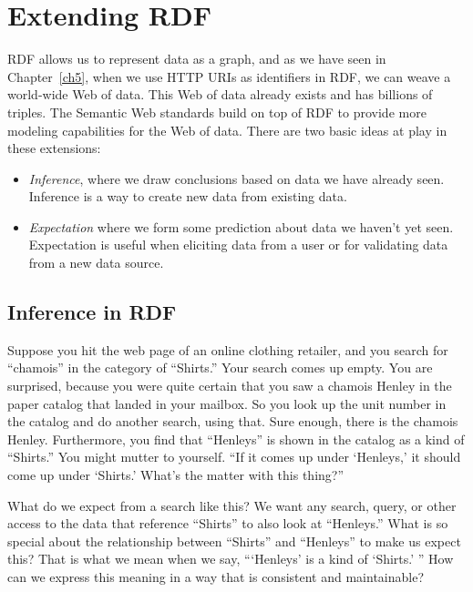 \chapter{Extending RDF}
\label{ch7}

RDF allows us to represent data as a graph, and as we have seen in Chapter~\ref{ch5}, when we use HTTP URIs as 
identifiers in RDF, we can weave a world-wide Web of data.  This Web of data already exists and has billions of triples. The Semantic Web standards build on top of RDF to provide more modeling capabilities for the Web of data.  There are two basic ideas at play in these extensions:

\begin{itemize}
    \item \emph{Inference}, where we draw conclusions based on data we have already seen.  Inference is
    a way to create new data from existing data. 
    \item \emph{Expectation} where we form some prediction about data we haven't yet seen.  Expectation is useful when 
    eliciting data from a user or for validating data from a new data source. 
\end{itemize}

\section{Inference in RDF}



Suppose you hit the web page of an online clothing retailer, and you
search for ``chamois'' in the category of ``Shirts.'' Your search comes
up empty. You are surprised, because you were quite certain that you saw
a chamois Henley in the paper catalog that landed in your mailbox. So
you look up the unit number in the catalog and do another search, using
that. Sure enough, there is the chamois Henley. Furthermore, you find
that ``Henleys'' is shown in the catalog as a kind of ``Shirts.'' You might
mutter to yourself. ``If it comes up under `Henleys,' it should come up
under `Shirts.' What's the matter with this thing?''

What do we expect from a search like this? We want any search, query, or
other access to the data that reference ``Shirts'' to also look at
``Henleys.'' What is so special about the relationship between
``Shirts'' and ``Henleys'' to make us expect this? That is what we mean
when we say, ```Henleys' is a kind of `Shirts.' '' How can we express
this meaning in a way that is consistent and maintainable?

